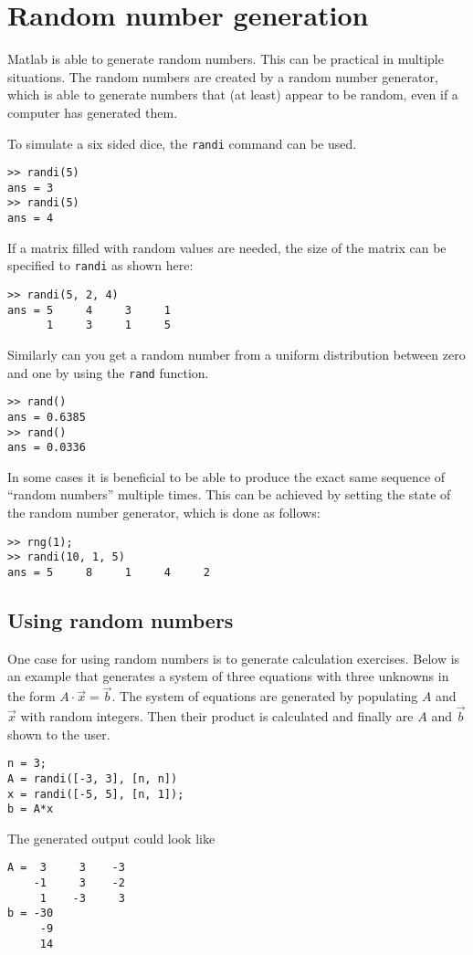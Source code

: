 \section{Random number generation}

Matlab is able to generate random numbers.
This can be practical in multiple situations.
The random numbers are created by a random number 
generator, which is able to generate numbers that 
(at least) appear to be random, even if a computer 
has generated them.

To simulate a six sided dice, the \verb!randi! command
can be used.
\begin{lstlisting}
>> randi(5)
ans = 3
>> randi(5)
ans = 4
\end{lstlisting}
If a matrix filled with random values are needed, the size
of the matrix can be specified to \verb!randi! as shown here:
\begin{lstlisting}
>> randi(5, 2, 4)
ans = 5     4     3     1
      1     3     1     5
\end{lstlisting}

Similarly can you get a random number from a uniform 
distribution between zero and one by using the \verb!rand! 
function.
\begin{lstlisting}
>> rand()
ans = 0.6385
>> rand()
ans = 0.0336
\end{lstlisting}
In some cases it is beneficial to be able to produce the exact
same sequence of ``random numbers'' multiple times.
This can be achieved by setting the state of the random number 
generator, which is done as follows:
\begin{lstlisting}
>> rng(1); 
>> randi(10, 1, 5)
ans = 5     8     1     4     2
\end{lstlisting}

\subsection{Using random numbers}

One case for using random numbers is to generate 
calculation exercises. 
Below is an example that generates a system of three
equations with three unknowns in the form 
$A \cdot \vec{x} = \vec{b}$.
The system of equations are generated by populating 
$A$ and $\vec{x}$ with random integers.
Then their product is calculated and finally are
$A$ and $\vec{b}$ shown to the user.
\begin{lstlisting}
n = 3;
A = randi([-3, 3], [n, n])
x = randi([-5, 5], [n, 1]);
b = A*x
\end{lstlisting}
The generated output could look like
\begin{lstlisting}
A =  3     3    -3
    -1     3    -2
     1    -3     3
b = -30
     -9
     14
\end{lstlisting}
 